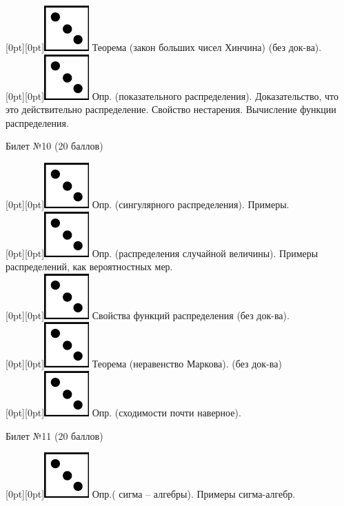 \documentclass[10pt]{article}
\begin{document}
\raisebox{-1pt}[0pt][0pt]{\includegraphics[width=0.02\linewidth]{3.png}} Теорема (закон больших чисел Хинчина) (без док-ва). \\
\raisebox{-1pt}[0pt][0pt]{\includegraphics[width=0.02\linewidth]{3.png}}  Опр. (показательного распределения). Доказательство, что это действительно распределение. Свойство нестарения. Вычисление функции распределения.  \\  
\begin{center} {\Large Билет №10 (20 баллов)} \end{center}
\raisebox{-1pt}[0pt][0pt]{\includegraphics[width=0.02\linewidth]{3.png}} Опр. (сингулярного распределения). Примеры. \\
\raisebox{-1pt}[0pt][0pt]{\includegraphics[width=0.02\linewidth]{3.png}} Опр. (распределения случайной величины). Примеры распределений, как вероятностных мер. \\
\raisebox{-1pt}[0pt][0pt]{\includegraphics[width=0.02\linewidth]{3.png}} Свойства функций распределения (без док-ва). \\
\raisebox{-1pt}[0pt][0pt]{\includegraphics[width=0.02\linewidth]{3.png}} Теорема (неравенство Маркова). (без док-ва) \\
\raisebox{-1pt}[0pt][0pt]{\includegraphics[width=0.02\linewidth]{3.png}} Опр. (сходимости почти наверное). \\
\begin{center} {\Large Билет №11 (20 баллов)} \end{center}
\raisebox{-1pt}[0pt][0pt]{\includegraphics[width=0.02\linewidth]{3.png}} Опр.( сигма – алгебры). Примеры сигма-алгебр. \\
\end{document}
